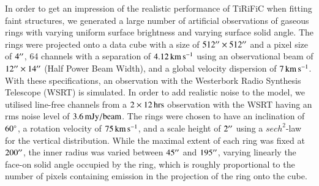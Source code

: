 \documentclass[oldversion]{aa}
\renewcommand{\deg}{\hbox{$^\circ$}}
\begin{document}
{In order to get an impression of the realistic performance of TiRiFiC
when fitting faint structures, we generated a large number of artificial
observations of gaseous rings with varying uniform surface brightness
and varying surface solid angle. The rings were projected onto a data
cube with a size of $512\hbox{$^{\prime\prime}$}\times 512\hbox{$^{\prime\prime}$}$ and a pixel size of $4\hbox{$^{\prime\prime}$}$, 64 channels with a separation of $4.12\,{\rm km}\,{\rm s}^{-1}$ using an observational
beam of $12\hbox{$^{\prime\prime}$}\times14\hbox{$^{\prime\prime}$}$ (Half Power Beam Width), and
a global velocity dispersion of $7\,{\rm km}\,{\rm s}^{-1}$. With
these specifications, an  observation with the Westerbork
Radio Synthesis Telescope (WSRT) is simulated. In order to add
realistic noise to the model, we utilised line-free channels from a
$2\times 12\,\rm hrs$ observation with the WSRT having an rms noise
level of $3.6\,{\rm mJy}/{\rm beam}$. The rings were chosen to have an
inclination of $60\deg$, a rotation velocity of $75\,{\rm km}\,{\rm
s}^{-1}$, and a scale height of $2\hbox{$^{\prime\prime}$}$ using a $sech^2$-law for
the vertical distribution. While the maximal extent of each ring was
fixed at $200\hbox{$^{\prime\prime}$}$, the inner radius was varied between $45\hbox{$^{\prime\prime}$}$
and $195\hbox{$^{\prime\prime}$}$, varying linearly the face-on solid angle occupied by
the ring, which is roughly proportional to the number of pixels containing emission in the
projection of the ring onto the cube.

}
\end{document}
